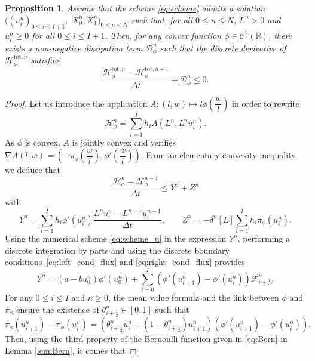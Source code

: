 \documentclass{amsart}
\newcommand\dt{\Delta t}
\newcommand\Fluxnum[1]{\mathcal{F}_{#1 \frac{1}{2}}^n}
\newcommand\R{\mathbb{R}}
\renewcommand\H{\mathcal{H}_{\phi}}
\newtheorem{proposition}[theorem]{Proposition}
\begin{document}
	
	\begin{proposition} \label{prop:disc_energ_dec}
	    Assume that the scheme \eqref{eq:scheme} admits a solution $((u_i^n)_{0 \leq i \leq I+1},$ $X_0^n, X_1^n)_{0 \leq n \leq N} $ such that, for all $0\leq n\leq N$, $L^n>0$ and $u_i^n\geq 0 $ for all $0\leq i\leq I+1$.
		Then, for any convex function $\phi \in \mathcal{C}^2(\R)$, there exists a non-negative dissipation term $\mathcal{D}_{\phi}^n$ such that the discrete derivative of $\H^{{\text{tot}},n}$ satisfies
		\begin{equation} \label{eq:disc_htot_decr}
			\dfrac{\H^{{\text{tot}},n} - \H^{{\text{tot}},n-1}}{\dt} + \mathcal{D}_{\phi}^n \leq 0.
		\end{equation}
	\end{proposition}
	\begin{proof}
	Let us introduce the application $A: (l,w) \mapsto l \phi\left(\dfrac{w}{l}\right)$ in order to rewrite 
	$$
	\H^n=\sum_{i=1}^I h_i A\left(L^n, L^n u_i^n \right).
	$$
	As $\phi$ is convex, $A$ is jointly convex and verifies $\nabla A(l,w)=(-\pi_\phi(\dfrac{w}{l}), \phi'(\dfrac{w}{l}))$. 
	From an elementary convexity inequality, we deduce that 
		\begin{equation}\label{disc_energ_dissip_startpt}
			\frac{\H^n - \H^{n-1}}{\dt} \leq Y^n + Z^n
		\end{equation}
		with
		\[
			Y^n = \sum_{i=1}^I h_i \phi'(u_i^n) \frac{L^n u_i^n - L^{n-1} u_i^{n-1}}{\dt}, \qquad 
			Z^n =  -\delta^n[L] \sum_{i=1}^I h_i  \pi_\phi(u_i^n).
		\]
		Using the numerical scheme \eqref{eq:scheme_u} in the expression $Y^n$, performing a discrete integration by parts and using the 
		discrete boundary conditions~\eqref{eq:left_cond_flux} and \eqref{eq:right_cond_flux} provides 
		\begin{equation}\label{def:Yn}
			Y^n  = (a-b u_0^n) \phi'(u_0^n) + \sum_{i=0}^{I} \left( \phi'(u_{i+1}^n) - \phi'(u_{i}^n) \right) \Fluxnum{i+}.
		\end{equation}
		For any $0 \leq i \leq I$ and $n \geq 0$, the mean value formula and the link between $\phi$ and $\pi_\phi$ 
		ensure the existence of $\theta_{i+\frac{1}{2}}^n \in [0,1]$ such that
		\begin{equation} \label{eq:mean_value}
			\pi_\phi(u_{i+1}^n) - \pi_\phi(u_{i}^n) = \left(\theta_{i+\frac{1}{2}}^n u_{i}^n + (1-\theta_{i+\frac{1}{2}}^n)u_{i+1}^n\right) \left(\phi'(u_{i+1}^n) - \phi'(u_{i}^n)\right).
		\end{equation}
	Then, using the third property of the Bernoulli function given in \eqref{eq:Bern} in Lemma \ref{lem:Bern}, it comes that

\end{proof}
\end{document}
